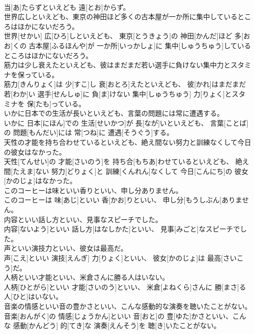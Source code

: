 \documentclass[8pt]{extreport}
\begin{document}
\begin{CJK}{UTF8}{min}
\\	当[あ]たらずといえども 遠[とお]からず。
\\	世界広しといえども、東京の神田ほど多くの古本屋が一か所に集中しているところはほかにないだろう。	
\\	世界[せかい] 広[ひろ]しといえども、 東京[とうきょう]の 神田[かんだ]ほど 多[おお]くの 古本屋[ふるほんや]が 一か所[いっかしょ]に 集中[しゅうちゅう]しているところはほかにないだろう。
\\	筋力は少し衰えたといえども、彼はまだまだ若い選手に負けない集中力とスタミナを保っている。	
\\	筋力[きんりょく]は 少[すこ]し 衰[おとろ]えたといえども、 彼[かれ]はまだまだ 若[わか]い 選手[せんしゅ]に 負[ま]けない 集中[しゅうちゅう] 力[りょく]とスタミナを 保[たも]っている。
\\	いかに日本での生活が長いといえども、言葉の問題には常に遭遇する。	
\\	いかに 日本[にほん]での 生活[せいかつ]が 長[なが]いといえども、 言葉[ことば]の 問題[もんだい]には 常[つね]に 遭遇[そうぐう]する。
\\	天性の才能を持ち合わせているといえども、絶え間ない努力と訓練なくして今日の彼女はなかった。	
\\	天性[てんせい]の 才能[さいのう]を 持ち合[もちあ]わせているといえども、 絶え間[たえま]ない 努力[どりょく]と 訓練[くんれん]なくして 今日[こんにち]の 彼女[かのじょ]はなかった。
\\	このコーヒーは味といい香りといい、申し分ありません。	
\\	このコーヒーは 味[あじ]といい 香[かお]りといい、 申し分[もうしぶん]ありません。
\\	内容といい話し方といい、見事なスピーチでした。	
\\	内容[ないよう]といい 話し方[はなしかた]といい、 見事[みごと]なスピーチでした。
\\	声といい演技力といい、彼女は最高だ。	
\\	声[こえ]といい 演技[えんぎ] 力[りょく]といい、 彼女[かのじょ]は 最高[さいこう]だ。
\\	人柄といい才能といい、米倉さんに勝る人はいない。	
\\	人柄[ひとがら]といい 才能[さいのう]といい、 米倉[よねくら]さんに 勝[まさ]る 人[ひと]はいない。
\\	音楽の情感といい音の豊かさといい、こんな感動的な演奏を聴いたことがない。	
\\	音楽[おんがく]の 情感[じょうかん]といい 音[おと]の 豊[ゆた]かさといい、こんな 感動[かんどう] 的[てき]な 演奏[えんそう]を 聴[き]いたことがない。

\end{CJK}
\end{document}
